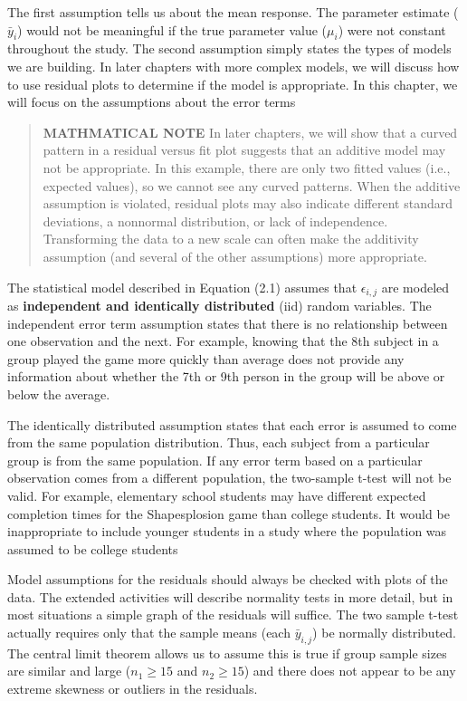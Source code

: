 \documentclass[
]{report}
\theoremstyle{definition}
\theoremstyle{definition}
\theoremstyle{definition}
\theoremstyle{definition}
\theoremstyle{remark}
\begin{document}
The first assumption tells us about the mean response. The parameter estimate (\(\bar{y}_i\)) would not be meaningful if the true parameter value (\(\mu_i\)) were not constant throughout the study. The second assumption simply states the types of models we are building. In later chapters with more complex models, we will discuss how to use residual plots to determine if the model is appropriate. In this chapter, we will focus on the assumptions about the error terms

\begin{quote}
\textbf{MATHMATICAL NOTE}
In later chapters, we will show that a curved pattern in a residual versus fit plot suggests that an additive model may not be appropriate. In this example, there are only two fitted values (i.e., expected values), so we cannot see any curved patterns. When the additive assumption is violated, residual plots may also indicate different standard deviations, a nonnormal distribution, or lack of independence. Transforming the data to a new scale can often make the additivity assumption (and several of the other assumptions) more appropriate.
\end{quote}

The statistical model described in Equation (2.1) assumes that \(\epsilon_{i, j}\) are modeled as \textbf{independent and identically distributed} (iid) random variables. The independent error term assumption states that there is no relationship between one observation and the next. For example, knowing that the 8th subject in a group played the game more quickly than average does not provide any information about whether the 7th or 9th person in the group will be above or below the average.

The identically distributed assumption states that each error is assumed to come from the same population distribution. Thus, each subject from a particular group is from the same population. If any error term
based on a particular observation comes from a different population, the two-sample t-test will not be valid. For example, elementary school students may have different expected completion times for the Shapesplosion game than college students. It would be inappropriate to include younger students in a study where the population was assumed to be college students

Model assumptions for the residuals should always be checked with plots of the data. The extended activities will describe normality tests in more detail, but in most situations a simple graph of the residuals will
suffice. The two sample t-test actually requires only that the sample means (each \(\bar{y}_{i,j}\)) be normally distributed. The central limit theorem allows us to assume this is true if group sample sizes are similar and large (\(n_1 \ge 15\) and \(n_2 \ge 15\)) and there does not appear to be any extreme skewness or outliers in the residuals.
\end{document}
